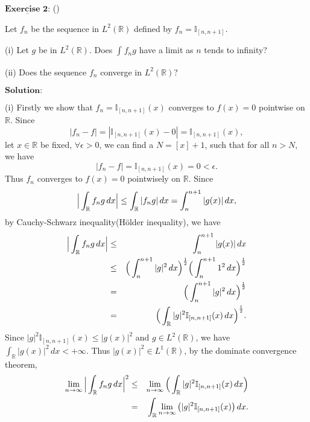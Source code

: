 \documentclass[12pt,a4paper]{ctexart}
\begin{document}
\newpage

$\underline{\textbf{Exercise 2:}}$  ()

Let $f_{n}$ be the sequence in $L^{2}(\mathbb{R})$ defined by $f_{n} = \mathbb{I}_{[n, n+1]}$.

(i) Let $g$ be in $L^{2}(\mathbb{R})$. Does $\int_{}^{} f_{n} g$ have a limit as $n$ tends to infinity?

(ii) Does the sequence $f_{n}$ converge in $L^{2}(\mathbb{R})$?

\vspace{8pt}
$\textbf{Solution:}$

(i) Firstly we show that $f_{n} = \mathbb{I}_{[n, n+1]} (x)$ converges to $f(x) = 0$ pointwise on $\mathbb{R}$. Since 
\begin{equation*}
    |f_{n} - f| = |\mathbb{I}_{[n, n+1]} (x) - 0| = \mathbb{I}_{[n, n+1]} (x), 
\end{equation*}
let $x \in \mathbb{R}$ be fixed, $\forall \epsilon > 0$, we can find a $N = [x] + 1$, such that for all $n > N$, we have 
\begin{equation*}
    |f_{n} - f| = \mathbb{I}_{[n, n+1]} (x) = 0 < \epsilon.
\end{equation*}
Thus $f_{n}$ converges to $f(x) = 0$ pointwisely on $\mathbb{R}$. Since  
\begin{equation*}
    \Big{|} \int_{\mathbb{R}}^{} f_{n} g \, d x \Big{|} \leq \int_{\mathbb{R}}^{} | f_{n} g | \, d x = \int_{n}^{n + 1} | g (x) | \, d x,
\end{equation*}
by Cauchy-Schwarz inequality(H\"older inequality), we have
\begin{eqnarray*}
\Big{|} \int_{\mathbb{R}}^{} f_{n} g \, d x \Big{|} & \leq & \int_{n}^{n + 1} | g (x) | \, d x \\
& \leq & \Big{(} \int_{n}^{n+1} |g|^{2} \, d x \Big{)}^{\frac{1}{2}} \Big{(} \int_{n}^{n+1} 1^{2} \, d x \Big{)}^{\frac{1}{2}} \\
& = & \Big{(} \int_{n}^{n+1} |g|^{2} \, d x \Big{)}^{\frac{1}{2}} \\ 
& = & \Big{(} \int_{\mathbb{R}}^{} |g|^{2} \mathbb{I}_{[n, n+1]} (x) \, d x \Big{)}^{\frac{1}{2}}.
\end{eqnarray*}
Since $|g|^{2} \mathbb{I}_{[n, n+1]} (x) \leq |g(x)|^{2}$ and $g \in L^{2}(\mathbb{R})$, we have $\int_{\mathbb{R}}^{} |g(x)|^{2} \, d x < + \infty$. Thus  $|g(x)|^{2} \in L^{1}(\mathbb{R})$, by the dominate convergence theorem,
\begin{eqnarray*}
\lim_{n \to \infty} \Big{|} \int_{\mathbb{R}}^{} f_{n} g \, d x \Big{|}^{2} & \leq & \lim_{n \to \infty} \Big{(} \int_{\mathbb{R}}^{} |g|^{2} \mathbb{I}_{[n, n+1]} (x) \, d x \Big{)} \\
& = & \int_{\mathbb{R}}^{} \lim_{n \to \infty} \big{(} |g|^{2} \mathbb{I}_{[n, n+1]} (x)  \big{)} \, d x.
\end{eqnarray*}
\end{document}

